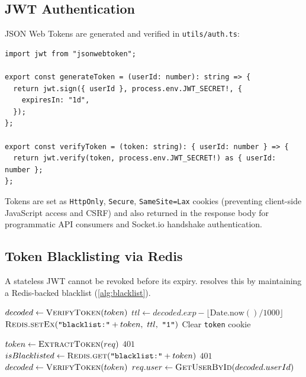 \subsection{JWT Authentication}

JSON Web Tokens are generated and verified in \texttt{utils/auth.ts}:

\begin{lstlisting}[caption={JWT generation and verification.}, label=lst:jwt]
import jwt from "jsonwebtoken";

export const generateToken = (userId: number): string => {
  return jwt.sign({ userId }, process.env.JWT_SECRET!, {
    expiresIn: "1d",
  });
};

export const verifyToken = (token: string): { userId: number } => {
  return jwt.verify(token, process.env.JWT_SECRET!) as { userId: number };
};
\end{lstlisting}

Tokens are set as \texttt{HttpOnly}, \texttt{Secure}, \texttt{SameSite=Lax}
cookies (preventing client-side JavaScript access and CSRF) and also returned
in the response body for programmatic API consumers and Socket.io handshake
authentication.

\subsection{Token Blacklisting via Redis}

A stateless JWT cannot be revoked before its expiry. \echoray{} resolves this
by maintaining a Redis-backed blacklist (\cref{alg:blacklist}).

\begin{algorithm}[H]
\caption{Token Blacklist Protocol}
\label{alg:blacklist}
\begin{algorithmic}[1]
  \State $decoded \gets \textsc{VerifyToken}(token)$
  \State $ttl \gets decoded.exp - \lfloor\text{Date.now}()/1000\rfloor$
  \State $\textsc{Redis.setEx}(\texttt{"blacklist:"}+token,\ ttl,\ \texttt{"1"})$
  \State Clear \texttt{token} cookie
\EndProcedure

  \State $token \gets \textsc{ExtractToken}(req)$
    \State \Return $401$
  \EndIf
  \State $isBlacklisted \gets \textsc{Redis.get}(\texttt{"blacklist:"}+token)$
    \State \Return $401$
  \EndIf
  \State $decoded \gets \textsc{VerifyToken}(token)$
  \State $req.user \gets \textsc{GetUserById}(decoded.userId)$
  \State {}
\EndProcedure
\end{algorithmic}
\end{algorithm}

